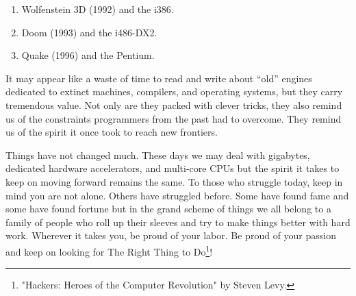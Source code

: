 \documentclass[book.tex]{subfiles}
\begin{document}
\begin{enumerate}
\item Wolfenstein 3D (1992) and the i386.
\item Doom (1993) and the i486-DX2.
\item Quake (1996) and the Pentium.
\end{enumerate}

\bigskip

It may appear like a waste of time to read and write about ``old'' engines dedicated to extinct machines, compilers, and operating systems, but they carry tremendous value. Not only are they packed with clever tricks, they also remind us of the constraints programmers from the past had to overcome. They remind us of the spirit it once took to reach new frontiers.\\
\par
Things have not changed much. These days we may deal with gigabytes, dedicated hardware accelerators, and multi-core CPUs but the spirit it takes to keep on moving forward remains the same. To those who struggle today, keep in mind you are not alone. Others have struggled before. Some have found fame and some have found fortune but in the grand scheme of things we all belong to a family of people who roll up their sleeves and try to make things better with hard work. Wherever it takes you, be proud of your labor. Be proud of your passion and keep on looking for The Right Thing to Do\footnote{"Hackers: Heroes of the Computer Revolution" by Steven Levy.}!\\
\end{document}
